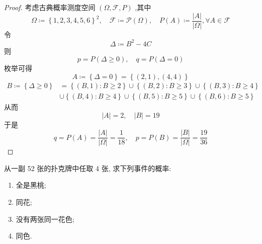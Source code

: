 \documentclass[../main.tex]{subfiles}
\begin{document}
\begin{proof}
    考虑古典概率测度空间 \(  \left(  \Omega ,\mathcal{F},P \right)   \) ,其中 \[
     \Omega \coloneqq \left\{ 1,2,3,4,5,6 \right\}^{2},\quad \mathcal{F}\coloneqq \mathcal{P}\left(  \Omega  \right),\quad P\left( A \right)\coloneqq \frac{\left| A \right|  }{\left|  \Omega  \right|  },\forall A\in \mathcal{F}   
    \]
  令  \[
     \Delta \coloneqq B^{2}-4C
    \]则 \[
    p= P\left(  \Delta \ge 0 \right),\quad q= P\left(  \Delta = 0 \right)  
    \]枚举可得 \[
    A\coloneqq \left\{  \Delta = 0   \right\}= \left\{ \left( 2,1 \right),\left( 4,4 \right)  \right\}
    \] \[
  \begin{aligned}
    B\coloneqq \left\{  \Delta \ge  0 \right\}&= \left\{ \left( B,1 \right):B\ge 2  \right\}\cup \left\{ \left( B,2 \right):B\ge 3  \right\}\cup \left\{ \left( B,3 \right):B\ge 4  \right\}\\ 
     &\cup \left\{ \left( B,4 \right):B\ge 4  \right\} \cup \left\{ \left( B,5 \right):B\ge 5  \right\}\cup \left\{ \left( B,6 \right):B\ge 5  \right\}
  \end{aligned}
    \]从而 \[
    \left| A \right|= 2,\quad \left| B \right|=19  
    \]于是 \[
    q= P\left( A \right)= \frac{\left| A \right|  }{\left|  \Omega  \right|  }= \frac{1 }{18 },\quad p= P\left( B \right)=  \frac{\left| B \right|  }{\left|  \Omega  \right|  }= \frac{19 }{36 }      
    \]
\end{proof}
\begin{exercise}{}{}
从一副 52 张的扑克牌中任取 4 张, 求下列事件的概率:
\begin{enumerate}
\item 全是黑桃;
\item 同花;
\item 没有两张同一花色;
\item 同色.
\end{enumerate}
\end{exercise}
\end{document}
